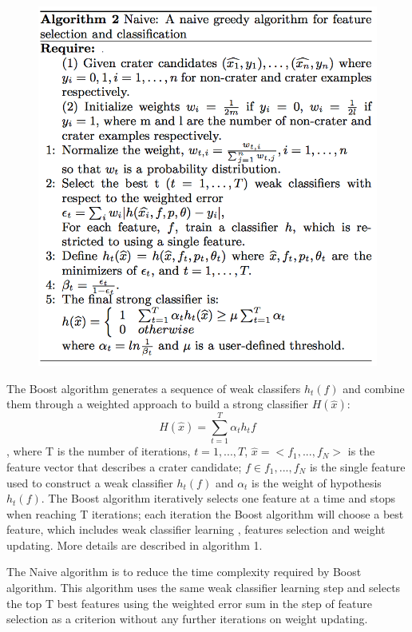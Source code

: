 \documentclass[conference]{IEEEtran}
\begin{document}
\begin{figure}[!htb]
\begin{center}
\includegraphics[scale=0.34]{naive.png}
\label{default}
\end{center}
\end{figure}
The Boost algorithm generates a sequence of weak classifers $h_t(f)$ and combine them through a weighted approach to build a strong classifier $H(\hat{x})$:
\begin{equation}
 H(\hat{x}) = \sum_{t=1}^{T}\alpha_th_t{f}
\end{equation},
where T is the number of iterations, $t = 1,...,T$, $\hat{x} = <f_1,...,f_N>$ is the feature vector that describes a crater candidate; $f \in {f_1,...,f_N}$ is the single feature used to construct a weak classifier $h_t(f)$ and $\alpha_t$ is the weight of hypothesis $h_t(f)$. The Boost algorithm iteratively selects one feature at a time and stops when reaching T iterations; each iteration the Boost algorithm will choose a best feature, which includes weak classifier learning , features selection and weight updating. More details are described in algorithm 1\cite{ding2011subkilometer}.


The Naive algorithm \cite{ding2011subkilometer}is to reduce the time complexity required by Boost algorithm. This algorithm uses the same weak classifier learning step and selects the top T best features using the weighted error sum in the step of feature selection as a criterion without any further iterations on weight updating.
\end{document}

